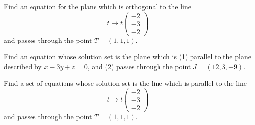 \documentclass[cahier-main.tex]{subfiles}
\begin{document}
\begin{challenge}
Find an equation for the plane which is orthogonal to the line 
\[
t\mapsto t \begin{pmatrix} -2\\-3\\-2\end{pmatrix}
\]
and passes through the point $T = (1,1,1)$.
\end{challenge}

\begin{challenge}
Find an equation whose solution set is the plane which is (1) parallel to the plane described by $x-3y+z=0$, and (2) passes through the point $J = (12,3,-9)$.
\end{challenge}

\begin{challenge}
Find a set of equations whose solution set is the line which is parallel to the line 
\[
t\mapsto t \begin{pmatrix} -2\\-3\\-2\end{pmatrix}
\]
and passes through the point $T = (1,1,1)$.
\end{challenge}
\end{document}

